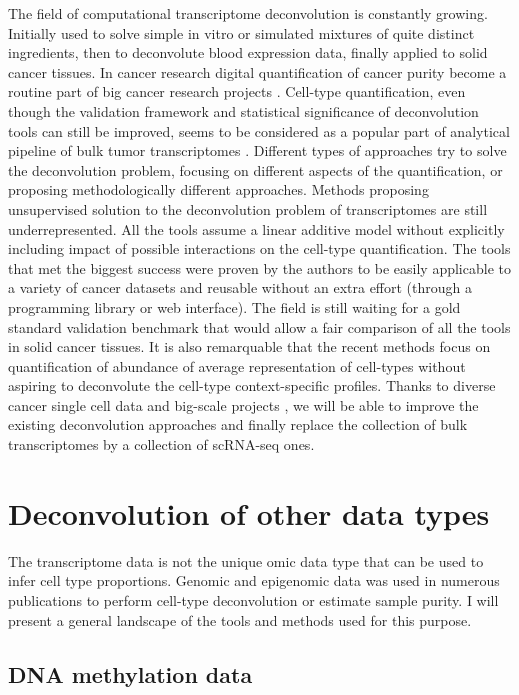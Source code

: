 \documentclass[12pt,]{book}
\theoremstyle{definition}
\theoremstyle{definition}
\theoremstyle{definition}
\theoremstyle{remark}
\begin{document}
The field of computational transcriptome deconvolution is constantly
growing. Initially used to solve simple in vitro or simulated mixtures
of quite distinct ingredients, then to deconvolute blood expression
data, finally applied to solid cancer tissues. In cancer research
digital quantification of cancer purity become a routine part of big
cancer research projects \citep{Yoshihara2013}. Cell-type
quantification, even though the validation framework and statistical
significance of deconvolution tools can still be improved, seems to be
considered as a popular part of analytical pipeline of bulk tumor
transcriptomes \citep{Cieslik2017}. Different types of approaches try to
solve the deconvolution problem, focusing on different aspects of the
quantification, or proposing methodologically different approaches.
Methods proposing unsupervised solution to the deconvolution problem of
transcriptomes are still underrepresented. All the tools assume a linear
additive model without explicitly including impact of possible
interactions on the cell-type quantification. The tools that met the
biggest success were proven by the authors to be easily applicable to a
variety of cancer datasets and reusable without an extra effort (through
a programming library or web interface). The field is still waiting for
a gold standard validation benchmark that would allow a fair comparison
of all the tools in solid cancer tissues. It is also remarquable that
the recent methods focus on quantification of abundance of average
representation of cell-types without aspiring to deconvolute the
cell-type context-specific profiles. Thanks to diverse cancer single
cell data and big-scale projects \citep{Regev2017}, we will be able to
improve the existing deconvolution approaches and finally replace the
collection of bulk transcriptomes by a collection of scRNA-seq ones.

\hypertarget{otherDecon}{%
\section{Deconvolution of other data types}\label{otherDecon}}

The transcriptome data is not the unique omic data type that can be used
to infer cell type proportions. Genomic and epigenomic data was used in
numerous publications to perform cell-type deconvolution or estimate
sample purity. I will present a general landscape of the tools and
methods used for this purpose.

\hypertarget{dna-methylation-data}{%
\subsection{DNA methylation data}\label{dna-methylation-data}}
\end{document}
